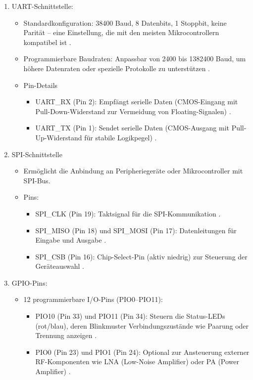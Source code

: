 \begin{enumerate}
	\item UART-Schnittstelle:
	\begin{itemize}
		\item Standardkonfiguration: 38400 Baud, 8 Datenbits, 1 Stoppbit, keine Parität – eine Einstellung, die mit den meisten Mikrocontrollern kompatibel ist \cite{HC05Datasheet:2010}.
		\item Programmierbare Baudraten: Anpassbar von 2400 bis 1382400 Baud, um höhere Datenraten oder spezielle Protokolle zu unterstützen \cite{ReicheltHC05:2025}.
		\item Pin-Details
		\begin{itemize}
			\item UART\_RX (Pin 2): Empfängt serielle Daten (CMOS-Eingang mit Pull-Down-Widerstand zur Vermeidung von Floating-Signalen) \cite{HC05Datasheet:2010}.
			\item UART\_TX (Pin 1): Sendet serielle Daten (CMOS-Ausgang mit Pull-Up-Widerstand für stabile Logikpegel) \cite{HC05Datasheet:2010}.
		\end{itemize}
		\end{itemize} 
	\item SPI-Schnittstelle 
	\begin{itemize}
		\item Ermöglicht die Anbindung an Peripheriegeräte oder Mikrocontroller mit SPI-Bus.
		\item Pins:
		\begin{itemize}
			\item SPI\_CLK (Pin 19): Taktsignal für die SPI-Kommunikation \cite{HC05Datasheet:2010}.
			\item SPI\_MISO (Pin 18) und SPI\_MOSI (Pin 17): Datenleitungen für Eingabe und Ausgabe \cite{HC05Datasheet:2010}.
			\item SPI\_CSB (Pin 16): Chip-Select-Pin (aktiv niedrig) zur Steuerung der Geräteauswahl \cite{HC05Datasheet:2010}.
		\end{itemize}
		\end{itemize}
		\item GPIO-Pins: 
		\begin{itemize}
			\item 12 programmierbare I/O-Pins (PIO0–PIO11):
			\begin{itemize}
				\item PIO10 (Pin 33) und PIO11 (Pin 34): Steuern die Status-LEDs (rot/blau), deren Blinkmuster Verbindungszustände wie Paarung oder Trennung anzeigen \cite{HC05Datasheet:2010}.
				\item PIO0 (Pin 23) und PIO1 (Pin 24): Optional zur Ansteuerung externer RF-Komponenten wie LNA (Low-Noise Amplifier) oder PA (Power Amplifier) \cite{HC05Datasheet:2010}.
			\end{itemize}
		\end{itemize}
	
	\end{enumerate}
	

